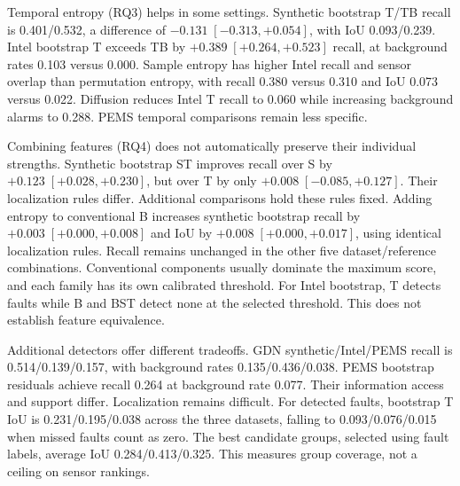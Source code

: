 \documentclass{llncs}
\begin{document}
Temporal entropy (RQ3) helps in some settings. Synthetic bootstrap T/TB
recall is 0.401/0.532, a difference of $-0.131\;[-0.313,+0.054]$,
with IoU 0.093/0.239. Intel bootstrap T exceeds TB by
$+0.389\;[+0.264,+0.523]$ recall, at background rates 0.103 versus 0.000.
Sample entropy has higher Intel recall and sensor overlap than permutation
entropy, with recall 0.380 versus 0.310 and IoU 0.073 versus 0.022.
Diffusion reduces Intel T recall to 0.060 while increasing background
alarms to 0.288. PEMS temporal comparisons remain less specific.

Combining features (RQ4) does not automatically preserve their individual
strengths. Synthetic bootstrap ST improves recall over S by
$+0.123\;[+0.028,+0.230]$, but over T by only
$+0.008\;[-0.085,+0.127]$. Their localization rules differ.
Additional comparisons hold these rules fixed.
Adding entropy to conventional B increases synthetic bootstrap recall by
$+0.003\;[+0.000,+0.008]$ and IoU by $+0.008\;[+0.000,+0.017]$,
using identical localization rules. Recall remains unchanged in the other
five dataset/reference combinations. Conventional components usually dominate
the maximum score, and each family has its own calibrated threshold.
For Intel bootstrap, T detects faults while B and BST detect none at the
selected threshold. This does not establish feature equivalence.

Additional detectors offer different tradeoffs. GDN synthetic/Intel/PEMS
recall is 0.514/0.139/0.157, with background rates 0.135/0.436/0.038.
PEMS bootstrap residuals achieve recall 0.264 at background rate 0.077.
Their information access and support differ. Localization remains difficult.
For detected faults, bootstrap T IoU is 0.231/0.195/0.038 across the three
datasets, falling to 0.093/0.076/0.015 when missed faults count as zero.
The best candidate groups, selected using fault labels, average IoU
0.284/0.413/0.325. This measures group coverage, not a ceiling on sensor rankings.
\end{document}
